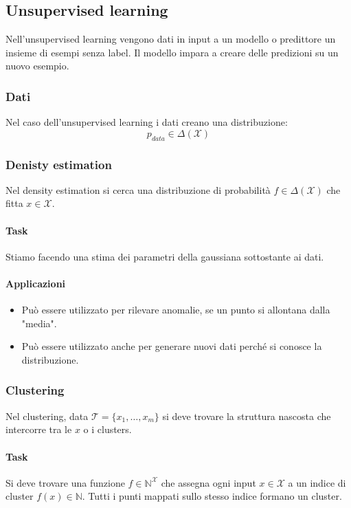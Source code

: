 \subsection{Unsupervised learning}
Nell'unsupervised learning vengono dati in input a un modello o predittore un insieme di esempi senza label.
Il modello impara a creare delle predizioni su un nuovo esempio.

\subsubsection{Dati}
Nel caso dell'unsupervised learning i dati creano una distribuzione:
$$p_{data}\in\Delta(\mathcal{X})$$
\subsubsection{Denisty estimation}
Nel density estimation si cerca una distribuzione di probabilità $f\in\Delta(\mathcal{X})$ che fitta $x\in\mathcal{X}$.

\paragraph{Task}
Stiamo facendo una stima dei parametri della gaussiana sottostante ai dati.

\paragraph{Applicazioni}
\begin{multicols}{2}
	\begin{itemize}
		\item Può essere utilizzato per rilevare anomalie, se un punto si allontana dalla "media".
		\item Può essere utilizzato anche per generare nuovi dati perché si conosce la distribuzione.
	\end{itemize}
\end{multicols}

\subsubsection{Clustering}
Nel clustering, data $\mathcal{T}=\{x_1, \dots, x_m\}$ si deve trovare la struttura nascosta che intercorre tra le $x$ o i clusters.

\paragraph{Task}
Si deve trovare una funzione $f\in\mathbb{N}^{\mathcal{X}}$ che assegna ogni input $x\in\mathcal{X}$ a un indice di cluster $f(x)\in\mathbb{N}$.
Tutti i punti mappati sullo stesso indice formano un cluster.

